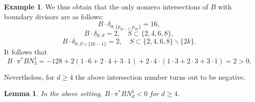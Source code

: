 \documentclass[11]{amsart}
\theoremstyle{plain}
\newtheorem{lemma}[theorem]{Lemma}
\theoremstyle{definition}
\newtheorem{example}[theorem]{Example}
\begin{document}
\begin{example}
We thus obtain that the only nonzero intersections of $B$ with boundary divisors are as follows: 
$$ B\cdot \delta_{0;\{p_{2k-1}, p_{2k}\}} = 16, $$
$$ B\cdot \delta_{0;S} = 2, \quad S\subset \{2,4,6,8\}, $$
$$ B\cdot \delta_{0;S\cup \{2k-1\}} = 2, \quad S\subset \{2,4,6,8\}\backslash\{2k\}. $$
It follows that 
$$ B\cdot \pi^{*}BN^1_3 = -128 + 2(1\cdot 6 + 2\cdot 4 + 3\cdot 1) + 2\cdot 4\cdot (1\cdot 3 + 2\cdot 3 + 3\cdot 1) 
= 2 > 0. $$
\end{example}

Nevertheless, for $d\geq 4$ the above intersection number turns out to be negative. 

\begin{lemma}
\label{lem:d-gonal}
In the above setting, $B\cdot \pi^{*}BN^1_d < 0$ for $d\geq 4$. 
\end{lemma}
\end{document}

